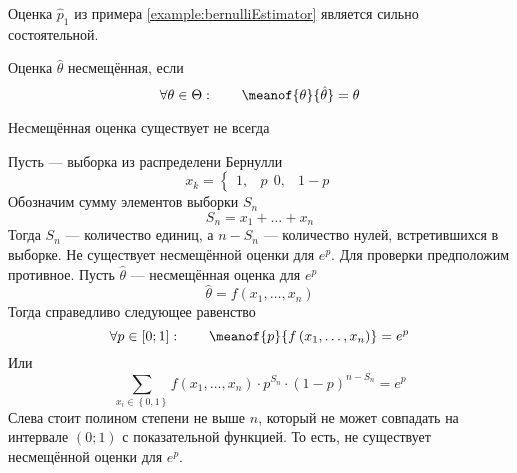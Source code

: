 \begin{example}
  Оценка $\hat{p}_1$ из примера \ref{example:bernulliEstimator}
  является сильно состоятельной.
\end{example}

\begin{definition}
  \label{def:estimatorBias}
  Оценка $\hat{\theta}$ несмещённая, если
  \begin{equation*}
    \forall\theta\in\Theta: \qquad \meanof{\theta}{\hat{\theta}} = \theta
  \end{equation*}
\end{definition}

\begin{remark}
  Несмещённая оценка существует не всегда
\end{remark}

\begin{example}
  Пусть \xsample --- выборка из распределени Бернулли
  \begin{equation*}
    x_k =
    \begin{cases}
      1,& p \ \
      0,& 1-p
    \end{cases}
  \end{equation*}
  Обозначим сумму элементов выборки $S_n$
  \begin{equation*}
    S_n = x_1 + \dots + x_n
  \end{equation*}
  Тогда $S_n$ --- количество единиц, а $n-S_n$ --- количество нулей,
  встретившихся в выборке.
  Не существует несмещённой оценки для $e^p$.
  Для проверки предположим противное.
  Пусть $\hat{\theta}$ --- несмещённая оценка для $e^p$
  \begin{equation*}
    \hat{\theta} = f\left( x_1, \dots, x_n \right)
  \end{equation*}
  Тогда справедливо следующее равенство
  \begin{equation*}
    \forall p \in \left[ 0; 1 \right]:\qquad
    \meanof{p}{f\left( x_1, \dots, x_n \right)}
    = e^p
  \end{equation*}
  Или
  \begin{equation*}
    \sum_{x_i \in \left\{ 0, 1 \right\}} f\left( x_1, \dots, x_n \right)
      \cdot p^{S_n} \cdot \left( 1 - p \right)^{n - S_n}
    = e^p
  \end{equation*}
  Слева стоит полином степени не выше $n$, который не может совпадать на
  интервале $\left( 0; 1 \right)$ с показательной функцией.
  То есть, не существует несмещённой оценки для $e^p$.
\end{example}

